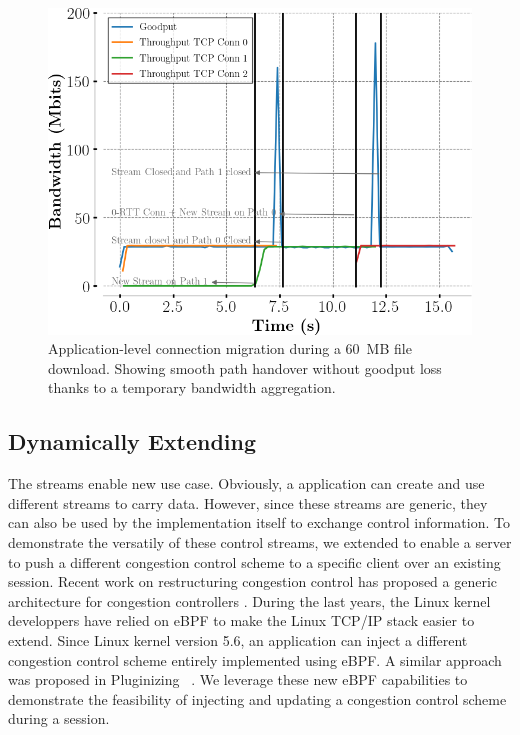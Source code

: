 \begin{figure}[!t]
  \begin{center}
    \includegraphics[width=\columnwidth]{figures/migration.png}
  \end{center}
\vspace{-0.5cm}
  \caption{Application-level connection migration during a 60~MB file download.
    Showing smooth path handover without goodput loss thanks to a temporary
    bandwidth aggregation.}
  \label{fig:conn_migration}
\end{figure}



\subsection{Dynamically Extending \tcpls}

The \tcpls streams enable new use case. Obviously, a \tcpls application can
create and use different streams to carry data. However, since these streams
are generic, they can also be used by the \tcpls implementation itself to
exchange control information. To demonstrate the versatily of these control
streams, we extended \tcpls to enable a server to push a different congestion
control scheme to a specific client over an existing \tcpls session. Recent
work on restructuring congestion control has proposed a generic architecture
for congestion controllers \cite{narayan2018restructuring}.
During the last years, the Linux kernel developpers have relied on eBPF
to make the Linux TCP/IP stack \cite{brakmo2017tcp,tran2020beyond} easier
to extend. Since Linux kernel version 5.6, an application can inject
a different congestion control scheme entirely implemented using eBPF. A similar
approach was proposed in Pluginizing \quic~\cite{de2019pluginizing}. We
leverage these new eBPF capabilities to demonstrate the feasibility of injecting
and updating a congestion control scheme during a \tcpls session.

